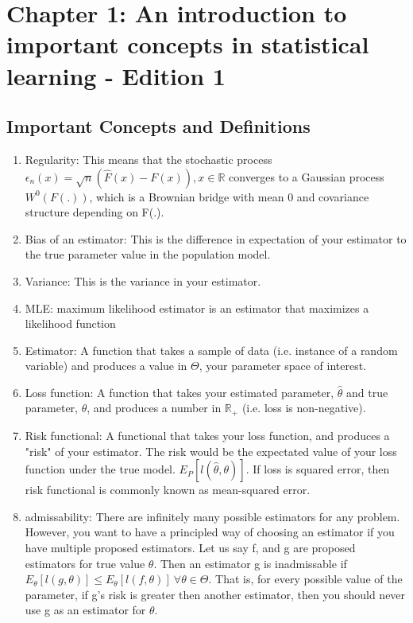 
\section{Chapter 1: An introduction to important concepts in statistical learning - Edition 1}
  \label{sec:chapterone}
  \subsection{Important Concepts and Definitions}
  	\begin{enumerate}
  		\item Regularity: This means that the stochastic process $\epsilon_n(x) = \sqrt{n} (\hat{F}(x) - F(x)), x \in \mathbb{R}$ converges to a Gaussian process $W^0(F(.))$, which is a Brownian bridge with mean 0 and covariance structure depending on F(.). 
  		\item Bias of an estimator: This is the difference in expectation of your estimator to the true parameter value in the population model.
  		\item Variance: This is the variance in your estimator.
  		\item MLE: maximum likelihood estimator is an estimator that maximizes a likelihood function
  		\item Estimator: A function that takes a sample of data (i.e. instance of a random variable) and produces a value in $\Theta$, your parameter space of interest.
  		\item Loss function: A function that takes your estimated parameter, $\hat{\theta}$ and true parameter, $\theta$, and produces a number in $\mathbb{R}_+$ (i.e. loss is non-negative).
  		\item Risk functional: A functional that takes your loss function, and produces a "risk" of your estimator. The risk would be the expectated value of your loss function under the true model. $E_P [ l(\hat{\theta}, \theta) ]$. If loss is squared error, then risk functional is commonly known as mean-squared error. 
  		\item admissability: There are infinitely many possible estimators for any problem. However, you want to have a principled way of choosing an estimator if you have multiple proposed estimators. Let us say f, and g are proposed estimators for true value $\theta$. Then an estimator g is inadmissable if $E_\theta [ l(g, \theta) ] \le E_\theta [ l(f, \theta) ] \ \forall \theta \in \Theta$. That is, for every possible value of the parameter, if g's risk is greater then another estimator, then you should never use g as an estimator for $\theta$.
  	\end{enumerate}

